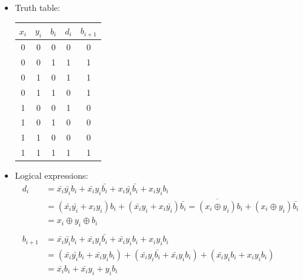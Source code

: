 \documentclass[12pt,openany, tikz,border=10pt]{book}
\begin{document}
			      	\begin{itemize}
			      		
			      		\item[] Truth table: \newline \vspace*{10px}
			      		      \begin{tabular}{ccc|cc}
			      		      	\hline
			      		      	$x_i$ & $y_i$ & $b_i$ & $d_i$ & $b_{i+1}$ \\
			      		      	\hline
			      		      	0     & 0     & 0     & 0     & 0         \\
			      		      	0     & 0     & 1     & 1     & 1         \\
			      		      	0     & 1     & 0     & 1     & 1         \\
			      		      	0     & 1     & 1     & 0     & 1         \\
			      		      	1     & 0     & 0     & 1     & 0         \\
			      		      	1     & 0     & 1     & 0     & 0         \\
			      		      	1     & 1     & 0     & 0     & 0         \\
			      		      	1     & 1     & 1     & 1     & 1         \\
			      		      	\hline
			      		      \end{tabular}
			      		      
			      		      
			      		      
			      		\item[]Logical expressions:
			      		      \begin{align*}
			      		      	d_i     & = \bar{x_i}\bar{y_i} b_i + \bar{x_i} y_i \bar{b_i} + x_i \bar{y_i} \bar{b_i} + x_i y_i b_i                                                       \\
			      		      	        & = (\bar{x_i} \bar{y_i} + x_i y_i) b_i + (\bar{x_i} y_i + x_i \bar{y_i}) \bar{b_i} = \overline{(x_i \oplus y_i)} b_i + (x_i \oplus y_i) \bar{b_i} \\
			      		      	        & = x_i \oplus y_i \oplus b_i                                                                                                                      \\
			      		      	\\
			      		      	b_{i+1} & = \bar{x_i} \bar{y_i} b_i +\bar{x_i} y_i \bar{b_i} + \bar{x_i} y_i b_i + x_i y_i b_i                                                             \\
			      		      	        & = (\bar{x_i} \bar{y_i} b_i + \bar{x_i} y_i b_i) + (\bar{x_i} y_i \bar{b_i} + \bar{x_i} y_i b_i) + (\bar{x_i}y_ib_i + x_iy_ib_i)                  \\
			      		      	        & = \bar{x_i} b_i + \bar{x_i} y_i + y_i b_i                                                                                                        \\
			      		      \end{align*}
			      		      

\end{itemize}
\end{document}
